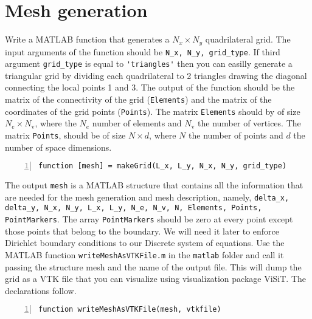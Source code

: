 \documentclass[unicode,11pt,a4paper,oneside,numbers=endperiod,openany]{scrartcl}
\begin{document}
\section{Mesh generation}
Write a \small{MATLAB} function that generates a $N_x \times N_y$ quadrilateral grid.
The input arguments of the function should be \lstinline+N_x, N_y, grid_type+. If third argument \lstinline+grid_type+
is equal to \lstinline+'triangles'+ then you can easilly generate a triangular grid by dividing each quadrilateral
to 2 triangles drawing the diagonal connecting the local points 1 and 3. 
The output of the function should be the matrix of the connectivity of the grid 
(\lstinline+Elements+) and the matrix of the coordinates of the grid points (\lstinline+Points+). 
The matrix \lstinline+Elements+ should by of size $N_e \times N_\text{v}$,
where the $N_e$ number of elements and $N_\text{v}$ the number of vertices. The matrix
\lstinline+Points+, should be of size $N \times d$, where $N$ the number of points and $d$ the number of 
space dimensions.
\begin{lstlisting}[numbers=left, numberstyle=\tiny, stepnumber=1, numbersep=10pt, identifierstyle=\ttfamily\color{Red}\bfseries]
function [mesh] = makeGrid(L_x, L_y, N_x, N_y, grid_type)
\end{lstlisting}
The output \lstinline+mesh+ is a MATLAB structure that contains all the information that are needed for the mesh generation
and mesh description, namely, \lstinline+delta_x, delta_y, N_x, N_y, L_x, L_y, N_e, N_v, N, Elements, Points, PointMarkers+. 
The array \lstinline+PointMarkers+ should be zero at every point except those points that belong to the boundary. We will 
need it later to enforce Dirichlet boundary conditions to our Discrete system of equations.
Use the MATLAB function \lstinline+writeMeshAsVTKFile.m+ in the \lstinline+matlab+ folder
and call it passing the structure mesh and the name of the output file.
This will dump the grid as a VTK file that you can visualize using visualization package ViSiT. The declarations follow.
\begin{lstlisting}[numbers=left, numberstyle=\tiny, stepnumber=1, numbersep=10pt]
function writeMeshAsVTKFile(mesh, vtkfile)
\end{lstlisting}
\end{document}
